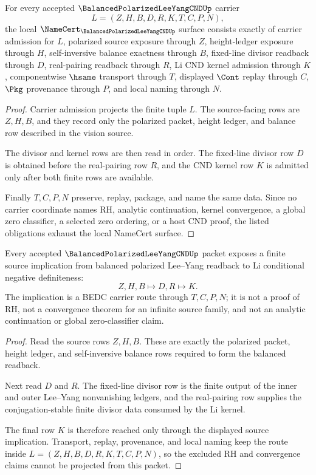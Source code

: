\begin{theorem}
\label{thm:balanced-polarized-lee-yang-cnd-namecert-obligations}
For every accepted $\BalancedPolarizedLeeYangCNDUp$ carrier
$$
L=(Z,H,B,D,R,K,T,C,P,N),
$$
the local $\NameCert_{\BalancedPolarizedLeeYangCNDUp}$ surface consists exactly of carrier admission for $L$, polarized source exposure through $Z$, height-ledger exposure through $H$, self-inversive balance exactness through $B$, fixed-line divisor readback through $D$, real-pairing readback through $R$, Li CND kernel admission through $K$, componentwise $\hsame$ transport through $T$, displayed $\Cont$ replay through $C$, $\Pkg$ provenance through $P$, and local naming through $N$.
\end{theorem}
\begin{proof}
Carrier admission projects the finite tuple $L$. The source-facing rows are $Z,H,B$, and they record only the polarized packet, height ledger, and balance row described in the vision source.

The divisor and kernel rows are then read in order. The fixed-line divisor row $D$ is obtained before the real-pairing row $R$, and the CND kernel row $K$ is admitted only after both finite rows are available.

Finally $T,C,P,N$ preserve, replay, package, and name the same data. Since no carrier coordinate names RH, analytic continuation, kernel convergence, a global zero classifier, a selected zero ordering, or a host CND proof, the listed obligations exhaust the local NameCert surface.
\end{proof}

\begin{theorem}
\label{thm:balanced-polarized-lee-yang-cnd-source-implication}
Every accepted $\BalancedPolarizedLeeYangCNDUp$ packet exposes a finite source implication from balanced polarized Lee--Yang readback to Li conditional negative definiteness:
$$
Z,H,B \longmapsto D,R \longmapsto K.
$$
The implication is a BEDC carrier route through $T,C,P,N$; it is not a proof of RH, not a convergence theorem for an infinite source family, and not an analytic continuation or global zero-classifier claim.
\end{theorem}
\begin{proof}
Read the source rows $Z,H,B$. These are exactly the polarized packet, height ledger, and self-inversive balance rows required to form the balanced readback.

Next read $D$ and $R$. The fixed-line divisor row is the finite output of the inner and outer Lee--Yang nonvanishing ledgers, and the real-pairing row supplies the conjugation-stable finite divisor data consumed by the Li kernel.

The final row $K$ is therefore reached only through the displayed source implication. Transport, replay, provenance, and local naming keep the route inside $L=(Z,H,B,D,R,K,T,C,P,N)$, so the excluded RH and convergence claims cannot be projected from this packet.
\end{proof}

